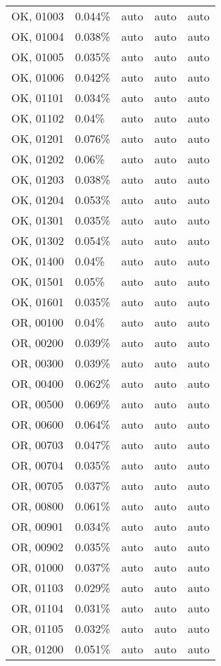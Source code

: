 \begin{longtable}[]{@{}lllll@{}}
OK, 01003 & 0.044\% & auto & auto & auto \\
OK, 01004 & 0.038\% & auto & auto & auto \\
OK, 01005 & 0.035\% & auto & auto & auto \\
OK, 01006 & 0.042\% & auto & auto & auto \\
OK, 01101 & 0.034\% & auto & auto & auto \\
OK, 01102 & 0.04\% & auto & auto & auto \\
OK, 01201 & 0.076\% & auto & auto & auto \\
OK, 01202 & 0.06\% & auto & auto & auto \\
OK, 01203 & 0.038\% & auto & auto & auto \\
OK, 01204 & 0.053\% & auto & auto & auto \\
OK, 01301 & 0.035\% & auto & auto & auto \\
OK, 01302 & 0.054\% & auto & auto & auto \\
OK, 01400 & 0.04\% & auto & auto & auto \\
OK, 01501 & 0.05\% & auto & auto & auto \\
OK, 01601 & 0.035\% & auto & auto & auto \\
OR, 00100 & 0.04\% & auto & auto & auto \\
OR, 00200 & 0.039\% & auto & auto & auto \\
OR, 00300 & 0.039\% & auto & auto & auto \\
OR, 00400 & 0.062\% & auto & auto & auto \\
OR, 00500 & 0.069\% & auto & auto & auto \\
OR, 00600 & 0.064\% & auto & auto & auto \\
OR, 00703 & 0.047\% & auto & auto & auto \\
OR, 00704 & 0.035\% & auto & auto & auto \\
OR, 00705 & 0.037\% & auto & auto & auto \\
OR, 00800 & 0.061\% & auto & auto & auto \\
OR, 00901 & 0.034\% & auto & auto & auto \\
OR, 00902 & 0.035\% & auto & auto & auto \\
OR, 01000 & 0.037\% & auto & auto & auto \\
OR, 01103 & 0.029\% & auto & auto & auto \\
OR, 01104 & 0.031\% & auto & auto & auto \\
OR, 01105 & 0.032\% & auto & auto & auto \\
OR, 01200 & 0.051\% & auto & auto & auto \\

\end{longtable}
